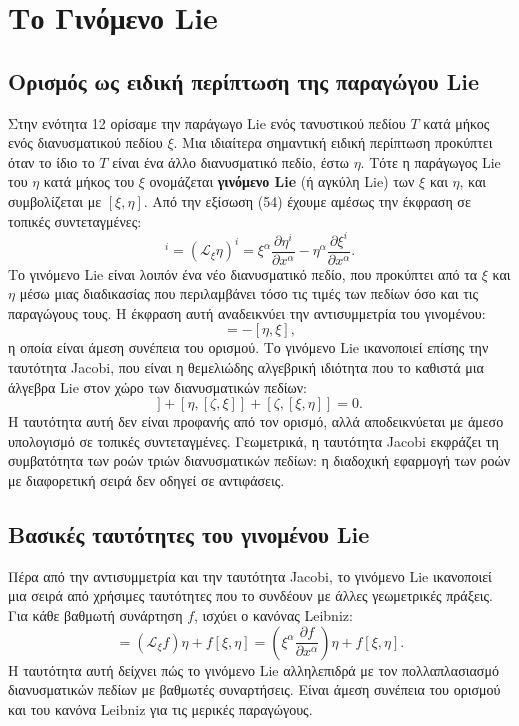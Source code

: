 \documentclass[12pt]{article}
\begin{document}
\section{Το Γινόμενο Lie}

\subsection{Ορισμός ως ειδική περίπτωση της παραγώγου Lie}

Στην ενότητα 12 ορίσαμε την παράγωγο Lie ενός τανυστικού πεδίου $T$ κατά μήκος ενός διανυσματικού πεδίου $\xi$. Μια ιδιαίτερα σημαντική ειδική περίπτωση προκύπτει όταν το ίδιο το $T$ είναι ένα άλλο διανυσματικό πεδίο, έστω $\eta$. Τότε η παράγωγος Lie του $\eta$ κατά μήκος του $\xi$ ονομάζεται \textbf{γινόμενο Lie} (ή αγκύλη Lie) των $\xi$ και $\eta$, και συμβολίζεται με $[\xi, \eta]$. Από την εξίσωση (54) έχουμε αμέσως την έκφραση σε τοπικές συντεταγμένες:
\begin{equation}
[\xi, \eta]^i = (\mathcal{L}_\xi \eta)^i = \xi^\alpha \frac{\partial \eta^i}{\partial x^\alpha} - \eta^\alpha \frac{\partial \xi^i}{\partial x^\alpha}.
\end{equation}
Το γινόμενο Lie είναι λοιπόν ένα νέο διανυσματικό πεδίο, που προκύπτει από τα $\xi$ και $\eta$ μέσω μιας διαδικασίας που περιλαμβάνει τόσο τις τιμές των πεδίων όσο και τις παραγώγους τους. Η έκφραση αυτή αναδεικνύει την αντισυμμετρία του γινομένου:
\begin{equation}
[\xi, \eta] = -[\eta, \xi],
\end{equation}
η οποία είναι άμεση συνέπεια του ορισμού. Το γινόμενο Lie ικανοποιεί επίσης την ταυτότητα Jacobi, που είναι η θεμελιώδης αλγεβρική ιδιότητα που το καθιστά μια άλγεβρα Lie στον χώρο των διανυσματικών πεδίων:
\begin{equation}
[\xi, [\eta, \zeta]] + [\eta, [\zeta, \xi]] + [\zeta, [\xi, \eta]] = 0.
\end{equation}
Η ταυτότητα αυτή δεν είναι προφανής από τον ορισμό, αλλά αποδεικνύεται με άμεσο υπολογισμό σε τοπικές συντεταγμένες. Γεωμετρικά, η ταυτότητα Jacobi εκφράζει τη συμβατότητα των ροών τριών διανυσματικών πεδίων: η διαδοχική εφαρμογή των ροών με διαφορετική σειρά δεν οδηγεί σε αντιφάσεις.

\subsection{Βασικές ταυτότητες του γινομένου Lie}

Πέρα από την αντισυμμετρία και την ταυτότητα Jacobi, το γινόμενο Lie ικανοποιεί μια σειρά από χρήσιμες ταυτότητες που το συνδέουν με άλλες γεωμετρικές πράξεις. Για κάθε βαθμωτή συνάρτηση $f$, ισχύει ο κανόνας Leibniz:
\begin{equation}
[\xi, f \eta] = (\mathcal{L}_\xi f) \eta + f [\xi, \eta] = (\xi^\alpha \frac{\partial f}{\partial x^\alpha}) \eta + f [\xi, \eta].
\end{equation}
Η ταυτότητα αυτή δείχνει πώς το γινόμενο Lie αλληλεπιδρά με τον πολλαπλασιασμό διανυσματικών πεδίων με βαθμωτές συναρτήσεις. Είναι άμεση συνέπεια του ορισμού και του κανόνα Leibniz για τις μερικές παραγώγους.
\end{document}
